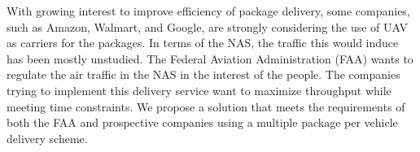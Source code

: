 With growing interest to improve efficiency of package delivery, some companies, such as Amazon, Walmart, and Google, are strongly considering the use of UAV as carriers for the packages. In terms of the NAS, the traffic this would induce has been mostly unstudied. The Federal Aviation Administration (FAA) wants to regulate the air traffic in the NAS in the interest of the people. The companies trying to implement this delivery service want to maximize throughput while meeting time constraints. We propose a solution that meets the requirements of both the FAA and prospective companies using a multiple package per vehicle delivery scheme.
